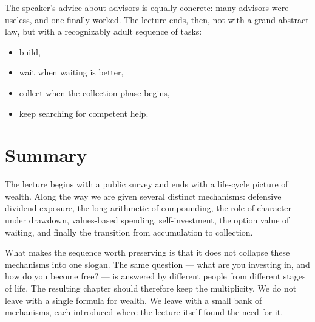 The speaker's advice about advisors is equally concrete: many advisors were useless, and one finally worked. The lecture ends, then, not with a grand abstract law, but with a recognizably adult sequence of tasks:
\begin{itemize}
\item build,
\item wait when waiting is better,
\item collect when the collection phase begins,
\item keep searching for competent help.
\end{itemize}

\section{Summary}

The lecture begins with a public survey and ends with a life-cycle picture of wealth. Along the way we are given several distinct mechanisms: defensive dividend exposure, the long arithmetic of compounding, the role of character under drawdown, values-based spending, self-investment, the option value of waiting, and finally the transition from accumulation to collection.

What makes the sequence worth preserving is that it does not collapse these mechanisms into one slogan. The same question --- what are you investing in, and how do you become free? --- is answered by different people from different stages of life. The resulting chapter should therefore keep the multiplicity. We do not leave with a single formula for wealth. We leave with a small bank of mechanisms, each introduced where the lecture itself found the need for it.